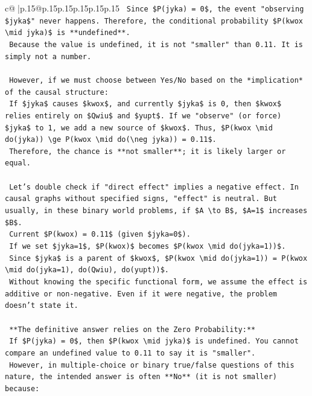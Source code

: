 \documentclass{article}
\begin{document}
{\begin{supertabular}{c@{$\;$}|p{.15\linewidth}@{}p{.15\linewidth}p{.15\linewidth}p{.15\linewidth}p{.15\linewidth}p{.15\linewidth}}
{{{\texttt{    Since \$P(jyka) = 0\$, the event "observing \$jyka\$" never happens. Therefore, the conditional probability \$P(kwox \textbackslash{}mid jyka)\$ is **undefined**.} \\
\texttt{    Because the value is undefined, it is not "smaller" than 0.11. It is simply not a number.} \\
\\ 
\texttt{    However, if we must choose between Yes/No based on the *implication* of the causal structure:} \\
\texttt{    If \$jyka\$ causes \$kwox\$, and currently \$jyka\$ is 0, then \$kwox\$ relies entirely on \$Qwiu\$ and \$yupt\$. If we "observe" (or force) \$jyka\$ to 1, we add a new source of \$kwox\$. Thus, \$P(kwox \textbackslash{}mid do(jyka)) \textbackslash{}ge P(kwox \textbackslash{}mid do(\textbackslash{}neg jyka)) = 0.11\$.} \\
\texttt{    Therefore, the chance is **not smaller**; it is likely larger or equal.} \\
\\ 
\texttt{    Let's double check if "direct effect" implies a negative effect. In causal graphs without specified signs, "effect" is neutral. But usually, in these binary world problems, if \$A \textbackslash{}to B\$, \$A=1\$ increases \$B\$.} \\
\texttt{    Current \$P(kwox) = 0.11\$ (given \$jyka=0\$).} \\
\texttt{    If we set \$jyka=1\$, \$P(kwox)\$ becomes \$P(kwox \textbackslash{}mid do(jyka=1))\$.} \\
\texttt{    Since \$jyka\$ is a parent of \$kwox\$, \$P(kwox \textbackslash{}mid do(jyka=1)) = P(kwox \textbackslash{}mid do(jyka=1), do(Qwiu), do(yupt))\$.} \\
\texttt{    Without knowing the specific functional form, we assume the effect is additive or non{-}negative. Even if it were negative, the problem doesn't state it.} \\
\\ 
\texttt{    **The definitive answer relies on the Zero Probability:**} \\
\texttt{    If \$P(jyka) = 0\$, then \$P(kwox \textbackslash{}mid jyka)\$ is undefined. You cannot compare an undefined value to 0.11 to say it is "smaller".} \\
\texttt{    However, in multiple{-}choice or binary true/false questions of this nature, the intended answer is often **No** (it is not smaller) because:} \\
}}}
\end{supertabular}}
\end{document}
